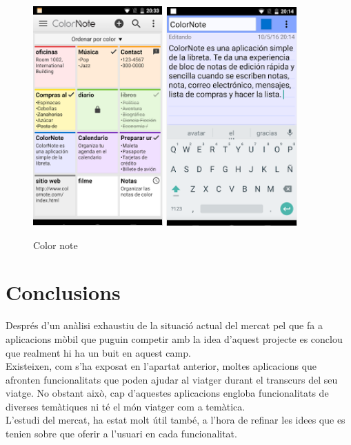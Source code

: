 \begin{itemize}
\begin{itemize}
\begin{figure}[!h]
\centering
\includegraphics[scale=0.90]{Figures/colorNote1.jpg}
\includegraphics[scale=0.90]{Figures/colorNote2.jpg}
\caption{Color note}
\end{figure}

\end{itemize}
\end{itemize}
\section{Conclusions}
Després d'un anàlisi exhaustiu de la situació actual del mercat pel que fa a aplicacions mòbil que puguin competir amb la idea d'aquest projecte es conclou que realment hi ha un buit en aquest camp.\\

Existeixen, com s'ha exposat en l'apartat anterior, moltes aplicacions que afronten funcionalitats que poden ajudar al viatger durant el transcurs del seu viatge. No obstant això, cap d'aquestes aplicacions engloba funcionalitats de diverses temàtiques ni té el món viatger com a temàtica.\\

L'estudi del mercat, ha estat molt útil també, a l'hora de refinar les idees que es tenien sobre que oferir a l'usuari en cada funcionalitat.